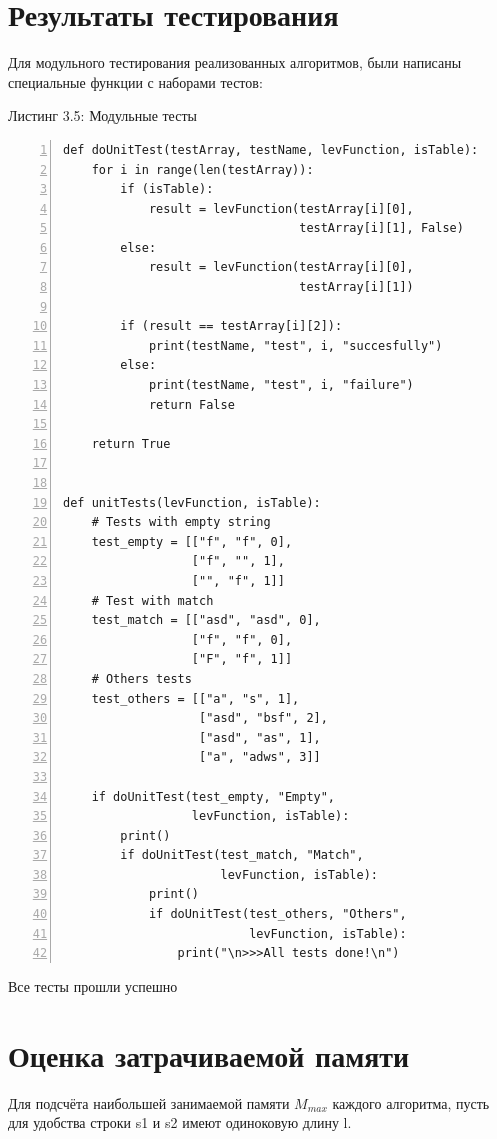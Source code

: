 \documentclass[12pt,a4paper]{report}
\begin{document}
\section{Результаты тестирования}

Для модульного тестирования реализованных алгоритмов, были написаны специальные функции с наборами тестов:

\textrm{Листинг 3.5: Модульные тесты}
\begin{lstlisting}[frame=single, numbers=left]
def doUnitTest(testArray, testName, levFunction, isTable):
    for i in range(len(testArray)):
        if (isTable):
            result = levFunction(testArray[i][0], 
                                 testArray[i][1], False)
        else:
            result = levFunction(testArray[i][0], 
                                 testArray[i][1])

        if (result == testArray[i][2]):
            print(testName, "test", i, "succesfully")
        else:
            print(testName, "test", i, "failure")
            return False
    
    return True


def unitTests(levFunction, isTable):
    # Tests with empty string
    test_empty = [["f", "f", 0], 
                  ["f", "", 1], 
                  ["", "f", 1]]
    # Test with match
    test_match = [["asd", "asd", 0], 
                  ["f", "f", 0], 
                  ["F", "f", 1]]
    # Others tests
    test_others = [["a", "s", 1], 
                   ["asd", "bsf", 2], 
                   ["asd", "as", 1], 
                   ["a", "adws", 3]]

    if doUnitTest(test_empty, "Empty", 
                  levFunction, isTable):
        print()
        if doUnitTest(test_match, "Match", 
                      levFunction, isTable):
            print()
            if doUnitTest(test_others, "Others", 
                          levFunction, isTable):
                print("\n>>>All tests done!\n")
\end{lstlisting}

Все тесты прошли успешно

\section{Оценка затрачиваемой памяти}

Для подсчёта наибольшей занимаемой памяти $M_{max}$ каждого алгоритма, пусть для удобства строки 
s1 и s2 имеют одиноковую длину l.
\end{document}
